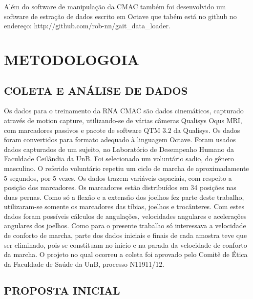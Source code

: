 \documentclass[a4paper, 12pt] {report}
\begin{document}
Além do software de manipulação da CMAC também foi desenvolvido um software de estração de dados escrito em Octave que tabém está no github no endereço: http://github.com/rob-nn/gait\_data\_loader.

	\chapter{METODOLOGOIA}
		\section{COLETA E ANÁLISE DE DADOS}
Os dados para o treinamento da RNA CMAC são dados cinemáticos, capturado através de motion capture, utilizando-se de várias câmeras Qualisys Oqus MRI, com marcadores passivos e pacote de software QTM 3.2 da Qualisys. Os dados foram convertidos para formato adequado à linguagem Octave. Foram usados dados capturados de um sujeito, no Laboratório de Desempenho Humano da Faculdade Ceilândia da UnB. Foi selecionado um voluntário sadio, do gênero masculino. O referido voluntário repetiu um ciclo de marcha de aproximadamente 5 segundos, por 5 vezes. Os dados trazem variáveis espaciais, com respeito a posição dos marcadores. Os marcadores estão distribuídos em 34 posições nas duas pernas. Como só a flexão e a extensão dos joelhos fez parte deste trabalho, utilizaram-se somente os marcadores das tíbias, joelhos e trocânteres. Com estes dados foram possíveis cálculos de angulações, velocidades angulares e acelerações angulares dos joelhos. Como para o presente trabalho só interessava a velocidade de conforto de marcha, parte dos dados iniciais e finais de cada amostra teve que ser eliminado, pois se constituam no início e na parada da velocidade de conforto da marcha. O projeto no qual ocorreu a coleta foi aprovado pelo Comitê de Ética da Faculdade de Saúde da UnB, processo N11911/12.

		\section{PROPOSTA INICIAL}
\end{document}
